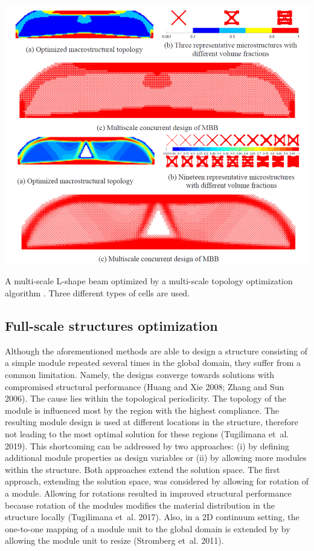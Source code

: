 \begin{marginfigure}
    \centering
    \includegraphics[width=\linewidth]{figures/02_literature/top_multiscale.png}
    \caption{A multi-scale L-shape beam optimized by a multi-scale topology optimization algorithm \cite{liu_two-scale_2020}. Three different types of cells are used.}
    \label{fig:02_multiscale}
\end{marginfigure}

\subsection{Full-scale structures optimization}

Although the aforementioned methods are able to design a structure consisting of a simple module repeated several times in the global domain, they suffer from a common limitation. Namely, the designs converge towards solutions with compromised structural performance (Huang and Xie 2008; Zhang and Sun 2006). The cause lies within the topological periodicity. The topology of the module is influenced most by the region with the highest compliance. The resulting module design is used at different locations in the structure, therefore not leading to the most optimal solution for these regions (Tugilimana et al. 2019). This shortcoming can be addressed by two approaches: (i) by defining additional module properties as design variables or (ii) by allowing more modules within the structure. Both approaches extend the solution space. The first approach, extending the solution space, was considered by allowing for rotation of a module. Allowing for rotations resulted in improved structural performance because rotation of the modules modifies the material distribution in the structure locally (Tugilimana et al. 2017). Also, in a 2D continuum setting, the one-to-one mapping of a module unit to the global domain is extended by by allowing the module unit to resize (Stromberg et al. 2011). ~

